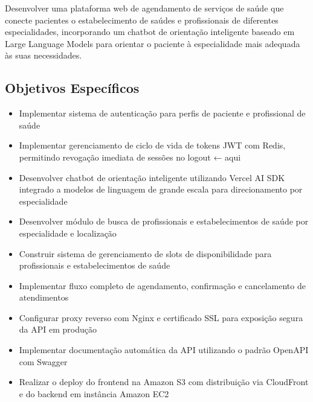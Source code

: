 Desenvolver uma plataforma web de agendamento de serviços de
saúde que conecte pacientes o estabelecimento de saúdes e profissionais de
diferentes especialidades, incorporando um chatbot de orientação
inteligente baseado em Large Language Models para orientar
o paciente à especialidade mais adequada às suas necessidades.

\subsection{Objetivos Específicos}
\label{subsec:specific-objectives}

\begin{itemize}
  \item Implementar sistema de autenticação para
        perfis de paciente e profissional de saúde

  \item Implementar gerenciamento de ciclo de vida
        de tokens JWT com Redis, permitindo revogação
        imediata de sessões no logout        ← aqui

  \item Desenvolver chatbot de orientação inteligente
        utilizando Vercel AI SDK integrado a modelos
        de linguagem de grande escala para
        direcionamento por especialidade

  \item Desenvolver módulo de busca de profissionais
        e estabelecimentos de saúde por especialidade e localização

  \item Construir sistema de gerenciamento de slots
        de disponibilidade para profissionais e
        estabelecimentos de saúde

  \item Implementar fluxo completo de agendamento,
        confirmação e cancelamento de atendimentos

  \item Configurar proxy reverso com Nginx e
        certificado SSL para exposição segura da
        API em produção

  \item Implementar documentação automática da API
        utilizando o padrão OpenAPI com Swagger

  \item Realizar o deploy do frontend na Amazon S3
        com distribuição via CloudFront e do backend
        em instância Amazon EC2
\end{itemize}

